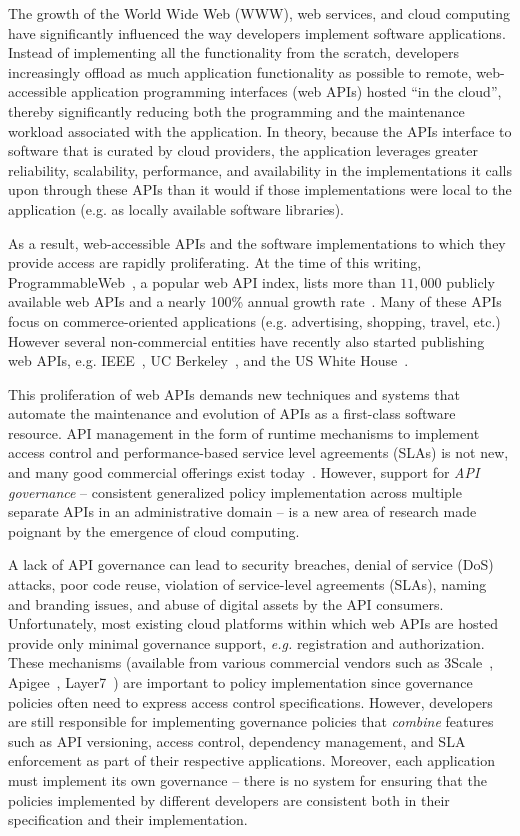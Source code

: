 The growth of the World Wide Web (WWW), web services, and cloud computing have
significantly influenced the way developers implement software applications.
Instead of implementing all the functionality from the scratch, developers
increasingly offload as much application functionality as possible to remote,
web-accessible application programming interfaces (web APIs) hosted ``in the
cloud'', thereby significantly reducing both the programming and
the maintenance workload associated with the application.  In theory, because
the APIs interface to software that is curated by cloud providers, the
application leverages greater
reliability, scalability, performance, 
and availability in the implementations it calls upon through these APIs than
it would if those implementations were local to the application
(e.g. as locally available software libraries).

As a result, web-accessible APIs and the software implementations to which
they provide access are rapidly proliferating.
At the time of this writing, 
ProgrammableWeb~\cite{pweb}, a popular web API index, lists more than $11,000$
publicly available
web APIs and a nearly 100\% annual growth rate~\cite{pweb_growth}. 
Many of these APIs focus on commerce-oriented applications (e.g.
advertising, shopping, travel, etc.)
However several non-commercial entities have recently
also started publishing web 
APIs, e.g. IEEE~\cite{ieeeapis}, UC Berkeley~\cite{ucbapis}, and the US White
House~\cite{whitehouseapis}.  

This proliferation of web APIs demands new techniques and systems that
automate the maintenance and evolution of APIs as a first-class software
resource.  API management in the form of runtime mechanisms to implement
access control and performance-based service level agreements (SLAs) is not
new, and many good commercial offerings exist today~\cite{3scale,apigee,layer7}.   
However, support for \textit{API governance} -- consistent generalized policy
implementation across multiple separate APIs in an administrative domain --
is a new area of research made poignant by the emergence of cloud computing.

A lack of API governance can lead to 
security breaches, denial of service (DoS)
attacks, poor code reuse, violation of service-level agreements (SLAs), 
naming and branding issues, and abuse of digital 
assets by the API consumers. Unfortunately, most existing cloud platforms
within which web APIs are hosted provide only minimal governance support, {\em
e.g.}
registration and authorization.  These mechanisms
(available from various commercial vendors such as
3Scale~\cite{3scale}, Apigee~\cite{apigee},
Layer7~\cite{layer7})
are important to policy implementation since governance policies often need to
express access control specifications.  
However, developers are still responsible for implementing governance policies
that {\em combine} features such as API versioning, access control,
dependency management, and SLA enforcement as part of their respective
applications.  Moreover, each application must
implement its own governance -- there is no system for ensuring that the
policies implemented by different developers are consistent both in their
specification and their implementation.

